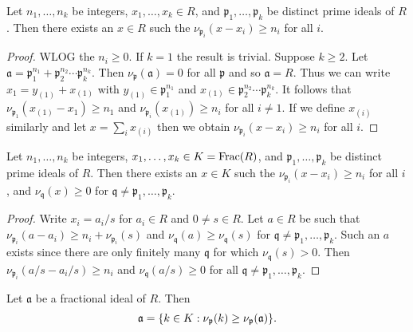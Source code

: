 \documentclass{memoir}
\begin{document}
\begin{lemma}
    Let $n_1,\dots,n_k$ be integers, $x_1,\dots,x_k\in R$, and $\mathfrak p_1,\dots,\mathfrak p_k$ be distinct prime ideals of $R$.
    Then there exists an $x\in R$ such the $\nu_{\mathfrak p_i}(x-x_i)\ge n_i$ for all $i$.
\end{lemma}
\begin{proof}
    WLOG the $n_i\ge0$.
    If $k=1$ the result is trivial.
    Suppose $k\ge 2$.
    Let $\mathfrak a = \mathfrak p_1^{n_1}+\mathfrak p_2^{n_2}\cdots\mathfrak p_k^{n_k}$.
    Then $\nu_{\mathfrak p}(\mathfrak a) = 0$ for all $\mathfrak p$ and so $\mathfrak a = R$.
    Thus we can write $x_1 = y_{(1)}+x_{(1)}$ with $y_{(1)}\in \mathfrak p_1^{n_1}$ and $x_{(1)}\in \mathfrak p_2^{n_2}\cdots\mathfrak p_k^{n_k}$.
    It follows that $\nu_{\mathfrak p_1}(x_{(1)}-x_1) \ge n_1$ and $\nu_{\mathfrak p_i}(x_{(1)})\ge n_i$ for all $i\ne 1$.
    If we define $x_{(i)}$ similarly and let $x = \sum_i x_{(i)}$ then we obtain $\nu_{\mathfrak p_i}(x-x_i) \ge n_i$ for all $i$.
\end{proof}
\begin{corollary}
    Let $n_1,\dots,n_k$ be integers, $x_1,\dots,x_k\in K = \text{Frac}(R)$, and $\mathfrak p_1,\dots,\mathfrak p_k$ be distinct prime ideals of $R$.
    Then there exists an $x\in K$ such the $\nu_{\mathfrak p_i}(x-x_i)\ge n_i$ for all $i$, and $\nu_{\mathfrak q}(x)\ge 0$ for $\mathfrak q\ne \mathfrak p_1,\dots,\mathfrak p_k$.
\end{corollary}
\begin{proof}
    Write $x_i = a_i/s$ for $a_i\in R$ and $0\ne s\in R$.
    Let $a\in R$ be such that $\nu_{\mathfrak p_i}(a-a_i) \ge n_i+\nu_{\mathfrak p_i}(s)$ and $\nu_{\mathfrak q}(a) \ge \nu_{\mathfrak q}(s)$ for $\mathfrak q\ne\mathfrak p_1,\dots,\mathfrak p_k$.
    Such an $a$ exists since there are only finitely many $\mathfrak q$ for which $\nu_{\mathfrak q}(s) > 0$.
    Then $\nu_{\mathfrak p_i}(a/s-a_i/s) \ge n_i$ and $\nu_{\mathfrak q}(a/s)\ge0$ for all $\mathfrak q\ne\mathfrak p_1,\dots,\mathfrak p_k$.
\end{proof}
\begin{corollary}
    Let $\mathfrak a$ be a fractional ideal of $R$. Then
    \begin{equation}
        \mathfrak a = \lbrace k\in K:\nu_{\mathfrak p}(k) \ge \nu_{\mathfrak p}(\mathfrak a)\rbrace.
    \end{equation}
\end{corollary}
\end{document}
